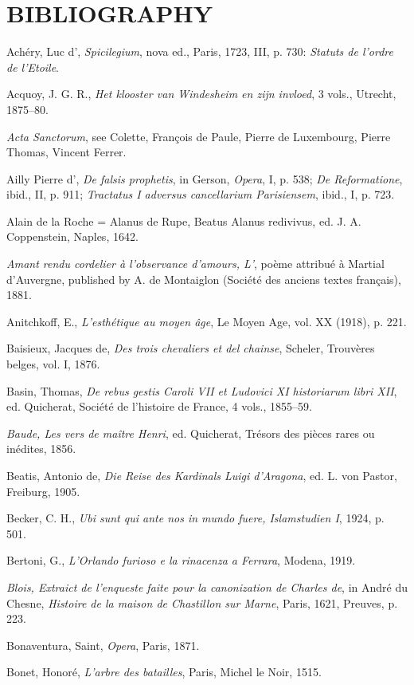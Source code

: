 \chapter{BIBLIOGRAPHY}

Achéry, Luc d', \emph{Spicilegium}, nova ed., Paris, 1723, III, p. 730:
\emph{Statuts de l'ordre de l'Etoile}.

Acquoy, J. G. R., \emph{Het klooster van Windesheim en zijn invloed}, 3
vols., Utrecht, 1875--80.

\emph{Acta Sanctorum}, see Colette, François de Paule, Pierre de
Luxembourg, Pierre Thomas, Vincent Ferrer.

Ailly Pierre d', \emph{De falsis prophetis}, in Gerson, \emph{Opera}, I,
p. 538; \emph{De Reformatione}, ibid., II, p. 911; \emph{Tractatus I
adversus cancellarium Parisiensem}, ibid., I, p. 723.

Alain de la Roche = Alanus de Rupe, Beatus Alanus redivivus, ed. J. A.
Coppenstein, Naples, 1642.

\emph{Amant rendu cordelier à l'observance d'amours, L'}, poème attribué
à Martial d'Auvergne, published by A. de Montaiglon (Société des anciens
textes français), 1881.

Anitchkoff, E., \emph{L'esthétique au moyen âge}, Le Moyen Age, vol. XX
(1918), p. 221.

Baisieux, Jacques de, \emph{Des trois chevaliers et del chainse},
Scheler, Trouvères belges, vol. I, 1876.

Basin, Thomas, \emph{De rebus gestis Caroli VII et Ludovici XI
historiarum libri XII}, ed. Quicherat, Société de l'histoire de France,
4 vols., 1855--59.

\emph{Baude, Les vers de maître Henri}, ed. Quicherat, Trésors des
pièces rares ou inédites, 1856.

Beatis, Antonio de, \emph{Die Reise des Kardinals Luigi d'Aragona}, ed.
L. von Pastor, Freiburg, 1905.

Becker, C. H., \emph{Ubi sunt qui ante nos in mundo fuere, Islamstudien
I}, 1924, p. 501.

Bertoni, G., \emph{L'Orlando furioso e la rinacenza a Ferrara}, Modena,
1919.

\emph{Blois, Extraict de l'enqueste faite pour la canonization de
Charles de}, in André du Chesne, \emph{Histoire de la maison de
Chastillon sur Marne}, Paris, 1621, Preuves, p. 223.

Bonaventura, Saint, \emph{Opera}, Paris, 1871.

Bonet, Honoré, \emph{L'arbre des batailles}, Paris, Michel le Noir,
1515.

